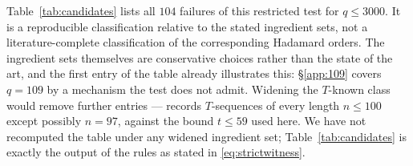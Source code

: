 \documentclass[11pt]{article}
\begin{document}
Table~\ref{tab:candidates} lists all \(104\) failures of this restricted
test for \(q\le3000\).  It is a reproducible classification relative to
the stated ingredient sets, not a literature-complete classification of
the corresponding Hadamard orders.  The ingredient sets themselves are
conservative choices rather than the state of the art, and the first
entry of the table already illustrates this: \S\ref{app:109} covers
\(q=109\) by a mechanism the test does not admit.  Widening the
\(T\)-known class would remove further entries --- \cite[\S2]{Djokovic2011}
records \(T\)-sequences of every length \(n\le100\) except possibly
\(n=97\), against the bound \(t\le59\) used here.  We have not
recomputed the table under any widened ingredient set;
Table~\ref{tab:candidates} is exactly the output of the rules as stated
in \eqref{eq:strictwitness}.
\end{document}
